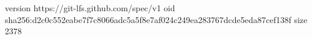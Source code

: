 version https://git-lfs.github.com/spec/v1
oid sha256:d2c0c552eabe7f7c8066adc5a5f8e7af024c249ea283767dcde5eda87cef138f
size 2378
